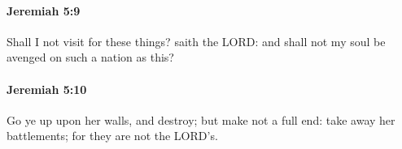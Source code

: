 		\paragraph{Jeremiah 5:9} %
			\label{JEREMIAH-5-9}

			Shall I not visit for these things? saith the LORD: and shall not my soul be avenged on such a nation as this?


		\paragraph{Jeremiah 5:10} %
			\label{JEREMIAH-5-10}

			Go ye up upon her walls, and destroy; but make not a full end: take away her battlements; for they are not the LORD’s.



